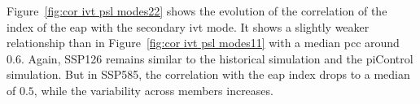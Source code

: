 %
%

Figure~\ref{fig:cor ivt psl modes22} shows the evolution of the correlation of the index of the \ac{eap} with the secondary \ac{ivt} mode. 
It shows a slightly weaker relationship than in Figure~\ref{fig:cor ivt psl modes11} with a median \ac{pcc} around $0.6$. 
Again, SSP126 remains similar to the historical simulation and the piControl simulation. 
But in SSP585, the correlation with the \ac{eap} index drops to a median of $0.5$, while the variability across members increases. 




